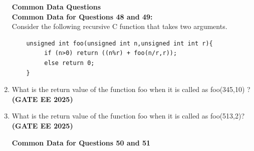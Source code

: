 \documentclass[journal,12pt,onecolumn]{IEEEtran}
\theoremstyle{remark}
\begin{document}
\begin{enumerate}
\begin{enumerate}
\end{enumerate}
\textbf{Common Data Questions} \\
\textbf{Common Data for Questions 48 and 49:} \\
Consider the following recursive C function that takes two arguments.\\
\begin{verbatim}
    unsigned int foo(unsigned int n,unsigned int int r){
         if (n>0) return ((n%r) + foo(n/r,r));
         else return 0;
    }
\end{verbatim}
\item What is the return value of the function 
    foo
 when it is called as foo(345,10) ?  \hfill \textbf{(GATE EE 2025)}
\begin{enumerate}
\end{enumerate}
\item What is the return value of the function  foo
 when it is called as foo(513,2)? \hfill \textbf{(GATE EE 2025)}
\begin{enumerate}
\end{enumerate}

\textbf{Common Data for Questions 50 and 51}


\end{enumerate}
\end{document}
